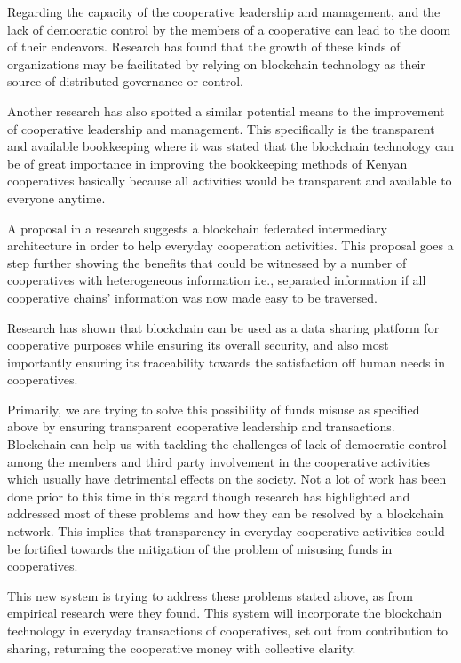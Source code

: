 \documentclass{article}
\begin{document}
\begin{flushleft}
Regarding the capacity of the cooperative leadership and management, and the lack of democratic control by the members of a cooperative can lead to the doom of their endeavors. Research has found that the growth of these kinds of organizations may be facilitated by relying on blockchain technology as their source of distributed governance or control. \cite{mannan2018fostering}

Another research has also spotted a similar potential means to the improvement of cooperative leadership and management. This specifically is the transparent and available bookkeeping where it was stated that the blockchain technology can be of great importance in improving the bookkeeping methods of Kenyan cooperatives basically because all activities would be transparent and available to everyone anytime. \cite{mitch_national}

A proposal in a research suggests a blockchain federated intermediary architecture in order to help everyday cooperation activities. This proposal goes a step further showing the benefits that could be witnessed by a number of cooperatives with heterogeneous information i.e., separated information if all cooperative chains' information was now made easy to be traversed. \cite{ieee_s8637578} 

Research has shown that blockchain can be used as a data sharing platform for cooperative purposes while ensuring its overall security, and also most importantly ensuring its traceability towards the satisfaction off human needs in cooperatives. \cite{alma991019580288704436, proquest2282979983} 

Primarily, we are trying to solve this possibility of funds misuse as specified above by ensuring transparent cooperative leadership and transactions. Blockchain can help us with tackling the challenges of lack of democratic control among the members and third party involvement in the cooperative activities which usually have detrimental effects on the society.
Not a lot of work has been done prior to this time in this regard though research has highlighted and addressed most of these problems and how they can be resolved by a blockchain network. This implies that transparency in everyday cooperative activities could be fortified towards the mitigation of the problem of misusing funds in cooperatives.

This new system is trying to address these problems stated above, as from empirical research were they found. This system will incorporate the blockchain technology in everyday transactions of cooperatives, set out from contribution to sharing, returning the cooperative money with collective clarity.


\end{flushleft}
\end{document}
